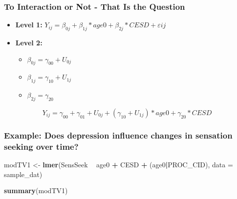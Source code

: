 \documentclass[]{article}
\newenvironment{Shaded}{\begin{snugshade}}{\end{snugshade}}
\newcommand{\KeywordTok}[1]{\textcolor[rgb]{0.13,0.29,0.53}{\textbf{#1}}}
\newcommand{\DataTypeTok}[1]{\textcolor[rgb]{0.13,0.29,0.53}{#1}}
\newcommand{\StringTok}[1]{\textcolor[rgb]{0.31,0.60,0.02}{#1}}
\newcommand{\OperatorTok}[1]{\textcolor[rgb]{0.81,0.36,0.00}{\textbf{#1}}}
\newcommand{\NormalTok}[1]{#1}
\begin{document}
\subsubsection{To Interaction or Not - That Is the
Question}\label{to-interaction-or-not---that-is-the-question}

\begin{itemize}
  \item \textbf{Level 1:} $Y_{ij} = \beta_{0j} + \beta_{1j}*age0 + \beta_{2j}*CESD + \varepsilon{ij}$
  \item \textbf{Level 2:} 
    \begin{itemize} 
      \item $\beta_{0j} = \gamma_{00} + U_{0j}$
      \item $\beta_{1j} = \gamma_{10} + U_{1j}$
      \item $\beta_{2j} = \gamma_{20}$
    \end{itemize}
\end{itemize}

\[Y_{ij} =  \gamma_{00} + \gamma_{01} + U_{0j} + (\gamma_{10} + U_{1j})*age0 + \gamma_{20}*CESD\]

\subsubsection{Example: Does depression influence changes in sensation
seeking over
time?}\label{example-does-depression-influence-changes-in-sensation-seeking-over-time}

\small

\begin{Shaded}
\begin{Highlighting}[]
\NormalTok{modTV1 <-}\StringTok{ }\KeywordTok{lmer}\NormalTok{(SensSeek }\OperatorTok{~}\StringTok{ }\NormalTok{age0 }\OperatorTok{+}\StringTok{ }\NormalTok{CESD }\OperatorTok{+}\StringTok{ }\NormalTok{(age0}\OperatorTok{|}\NormalTok{PROC_CID), }\DataTypeTok{data =}\NormalTok{ sample_dat)}
\end{Highlighting}
\end{Shaded}

\small

\begin{Shaded}
\begin{Highlighting}[]
\KeywordTok{summary}\NormalTok{(modTV1)}
\end{Highlighting}
\end{Shaded}
\end{document}
